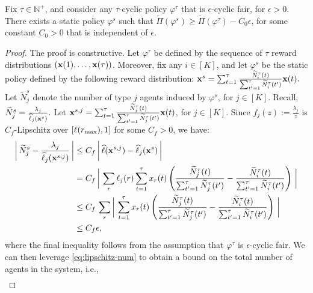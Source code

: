 \documentclass[12pt]{article}
\begin{document}
 

\begin{lemma}\label{lem:static-beats-cyclic}
Fix $\tau \in \mathbb{N}^+$, and consider any $\tau$-cyclic policy $\varphi^\tau$ that is $\epsilon$-cyclic fair, for $\epsilon > 0$. There exists a static policy $\varphi^s$ such that 
    $\widetilde{\Pi}(\varphi^s) \geq \widetilde{\Pi}(\varphi^\tau) - C_0\epsilon$,
for some constant $C_0 > 0$ that is independent of $\epsilon$.
\end{lemma}

\begin{proof}
The proof is constructive. Let $\varphi^\tau$ be defined by the sequence of $\tau$ reward distributions $\left(\mathbf{x}(1),\ldots,\mathbf{x}(\tau)\right)$. Moreover, fix any $i \in [K]$, and let $\varphi^s$ be the static policy defined by the following reward distribution:
$\mathbf{x}^s = \sum_{t=1}^\tau \frac{\widetilde{N}_i^\tau(t)}{\sum_{t'=1}^\tau \widetilde{N}_i^\tau(t')} \mathbf{x}(t).$
Let $\widetilde{N}_j^s$ denote the number of type $j$ agents induced by $\varphi^s$, for $j \in [K]$.  Recall,
   $ \widetilde{N}_j^s = \frac{\lambda_j}{\widehat{\ell}_j(\mathbf{x}^s)}.$ Let $\mathbf{x}^{s,j} = \sum_{t=1}^\tau \frac{\widetilde{N}_j^\tau(t)}{\sum_{t'=1}^\tau \widetilde{N}_j^\tau(t')} \mathbf{x}(t)$, for $j \in [K]$. Since $f_j(z):= \frac{\lambda_j}{z}$ is $C_f$-Lipschitz over $[\ell(r_{\max}),1]$ for some $C_f > 0$, we have:
\begin{align}\label{eq:lipschitz-num}
   \bigg{\lvert}\, \widetilde{N}_j^s-\frac{\lambda_j}{\widehat{\ell}_j(\mathbf{x}^{s,j})}\, \bigg{\rvert} &\leq  C_f\, \bigg{\lvert}\, \widehat{\ell}(\mathbf{x}^{s,j})-\widehat{\ell}_j(\mathbf{x}^s)\, \bigg{\rvert} \\ &= C_f\, \bigg{\lvert}\, \sum_r \ell_j(r)\sum_{t=1}^\tau x_r(t)\left(\frac{\widetilde{N}_j^\tau(t)}{\sum_{t'=1}^\tau \widetilde{N}_j^\tau(t')} - \frac{\widetilde{N}_i^\tau(t)}{\sum_{t'=1}^\tau \widetilde{N}_i^\tau(t')}\right)\, \bigg{\rvert} \notag \\
   &\leq C_f\,\sum_r \bigg{\lvert}\,\sum_{t=1}^\tau x_r(t)\left(\frac{\widetilde{N}_j^\tau(t)}{\sum_{t'=1}^\tau \widetilde{N}_j^\tau(t')} - \frac{\widetilde{N}_i^\tau(t)}{\sum_{t'=1}^\tau \widetilde{N}_i^\tau(t')}\right)\, \bigg{\rvert}\\& \leq C_f\epsilon,
\end{align}
where the final inequality follows from the assumption that $\varphi^\tau$ is $\epsilon$-cyclic fair. We can then leverage \eqref{eq:lipschitz-num} to obtain a bound on the total number of agents in the system, i.e.,
\begin{align}\label{eq:lipschitz-total-num}

\end{align}
\end{proof}
\end{document}
